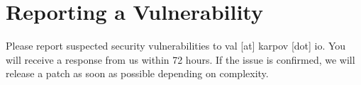 \chapter{Reporting a Vulnerability}
\hypertarget{md_node__modules_2mpath_2_s_e_c_u_r_i_t_y}{}\label{md_node__modules_2mpath_2_s_e_c_u_r_i_t_y}
\label{md_node__modules_2mpath_2_s_e_c_u_r_i_t_y_autotoc_md2550}%
%


Please report suspected security vulnerabilities to val \mbox{[}at\mbox{]} karpov \mbox{[}dot\mbox{]} io. You will receive a response from us within 72 hours. If the issue is confirmed, we will release a patch as soon as possible depending on complexity. 